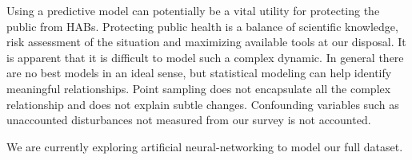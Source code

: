 


Using a predictive model can potentially be a vital utility for protecting the public from HABs. Protecting public health is a balance of scientific knowledge, risk assessment of the situation and maximizing available tools at our disposal. It is apparent that it is difficult to model such a complex dynamic. In general there are no best models in an ideal sense, but statistical modeling can help identify meaningful relationships. Point sampling does not encapsulate all the complex relationship and does not explain subtle changes. Confounding variables such as unaccounted disturbances not measured from our survey is not accounted. 

We are currently exploring artificial neural-networking to model our full dataset.
